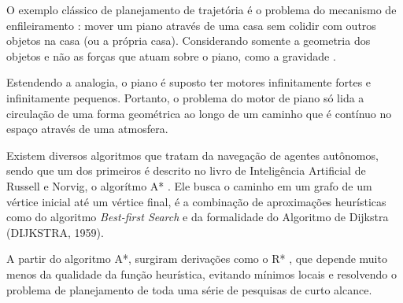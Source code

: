 O exemplo clássico de planejamento de trajetória é o problema do mecanismo de enfileiramento \cite{bsharir}: 
mover um piano através de uma casa sem colidir com outros objetos na casa (ou a própria casa). Considerando somente a 
geometria dos objetos e não as forças que atuam sobre o piano, como a gravidade .

Estendendo a analogia, o piano é suposto ter motores infinitamente fortes e infinitamente pequenos. Portanto, o problema do motor 
de piano só lida a circulação de uma forma geométrica ao longo de um caminho que é contínuo no espaço através de uma atmosfera.

Existem diversos algoritmos que tratam da navegação de agentes autônomos, sendo que um dos primeiros é descrito no livro de
Inteligência Artificial de Russell e Norvig, o algorítmo A* \cite{brussel}. Ele busca o caminho em um grafo de
um vértice inicial até um vértice final, é a combinação de aproximações heurísticas como do algoritmo {\it Best-first Search} e da
formalidade do Algoritmo de Dijkstra (DIJKSTRA, 1959). 

A partir do algoritmo A*, surgiram derivações como o R* \cite{plikhachev}, que depende muito menos da qualidade da função heurística, 
evitando mínimos locais e resolvendo o problema de planejamento de toda uma série de pesquisas de curto alcance.
